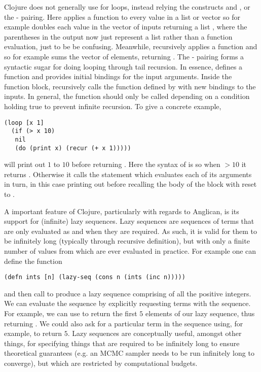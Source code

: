 Clojure does not generally use
for loops, instead relying the constructs \map and \reduce, or the - pairing. Here
\map applies a function to every value in a list or vector so for example {\small {}}
doubles each value in the vector of inputs returning a list {\small {}}, where the parentheses in the output
now just represent a list rather than a function evaluation, just to be be confusing.  Meanwhile, \reduce recursively applies
a function and so for example {\small {}} sums the vector of elements,
returning {\small {}}.  The - pairing forms
a syntactic sugar for doing looping through tail recursion.  In essence,  defines a function and provides
initial bindings for the input arguments.  Inside the  function block,  recursively calls the
function defined by  with new bindings to the inputs.  In general, the  function should
only be called depending on a condition holding true to prevent infinite recursion.  To give a concrete example,
 \begin{lstlisting}[basicstyle=\ttfamily\small,frame=none]
 (loop [x 1] 
  (if (> x 10) 
   nil 
   (do (print x) (recur (+ x 1)))))
 \end{lstlisting}\vspace{-5pt}
will print out $1$ to $10$ before returning .  
Here the syntax of  is  so when $>10$
it returns .  Otherwise it calls the  statement which evaluates each of its arguments in turn, in
this case printing out  before recalling the body of the  block with   reset to .

A important feature of Clojure, particularly with regards to Anglican, is its support for (infinite) lazy sequences.
Lazy sequences are sequences of terms that are only evaluated as and when they are required.  As such, it is 
valid for them to be infinitely long (typically through recursive definition), but with only a finite number
of values from which are ever evaluated in practice.    For example one can define the function
 \begin{lstlisting}[basicstyle=\ttfamily\small,frame=none]
 (defn ints [n] (lazy-seq (cons n (ints (inc n)))))
 \end{lstlisting}\vspace{-5pt}
 and then call {\small {}} to produce a
lazy sequence comprising of all the positive integers.  We can evaluate the sequence by explicitly requesting
terms with the sequence.  For example, we can use {\small {}} to return the first $5$ elements
of our lazy sequence, thus returning {\small {}}.  We could also ask for a particular term in the
sequence using, for example, {\small {}} to return $5$.
Lazy sequences are conceptually useful, amongst other things, for specifying things that
are required to be infinitely long to ensure theoretical guarantees (e.g. an MCMC sampler needs to be run
infinitely long to converge), but which are restricted by computational budgets.

